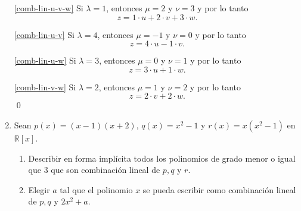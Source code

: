 \begin{enumerate}[resume, topsep=6pt, itemsep=.4cm]
    \ref{comb-lin-u-v-w} Si $\lambda=1$, entonces $\mu=2$ y $\nu=3$ y por lo tanto
    \begin{equation*}
        z=1\cdot u+2\cdot v+3\cdot w.
    \end{equation*}

    \ref{comb-lin-u-v} Si $\lambda=4$, entonces $\mu=-1$ y $\nu=0$ y por lo tanto
    \begin{equation*}
        z=4\cdot u-1\cdot v.
    \end{equation*}

    \ref{comb-lin-u-w} Si $\lambda=3$, entonces $\mu=0$ y $\nu=1$ y por lo tanto
    \begin{equation*}
        z=3\cdot u+1\cdot w.
    \end{equation*}

    \ref{comb-lin-v-w} Si $\lambda=2$, entonces $\mu=1$ y $\nu=2$ y por lo tanto
    \begin{equation*}
        z=2\cdot v+2\cdot w.
    \end{equation*}
    \qed     
    
    \item Sean $p(x)=(x-1)(x+2)$, $q(x)=x^2-1$ y $r(x)=x(x^2-1)$ en $\mathbb{R}[x]$.
        \begin{enumerate}
        \item\label{comb-lineal-pol-a} Describir en forma implícita todos los polinomios de grado menor o igual que $3$ que son combinación lineal de $p,q$ y $r$.
        \item\label{comb-lineal-pol-b} Elegir $a$ tal que el polinomio $x$ se pueda escribir como combinación lineal de $p,q$ y $2x^2+a$.
        \end{enumerate}
    
    \rta 


\end{enumerate}

